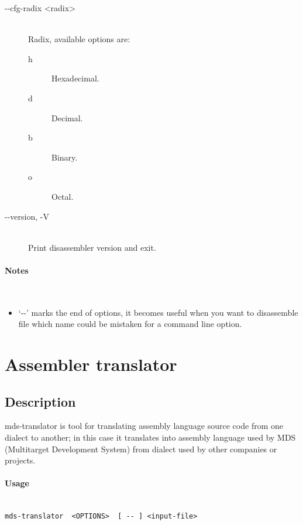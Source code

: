 \begin{description}
            \item[-{}-cfg-radix <radix>]~\\
                Radix, available options are:
                \begin{description}
                    \item [h] Hexadecimal.
                    \item [d] Decimal.
                    \item [b] Binary.
                    \item [o] Octal.
                \end{description}


            \item[-{}-version, -V]~\\
                Print disassembler version and exit.
        \end{description}

    \paragraph{Notes}~\\
        \begin{itemize}
            \item `-{}-' marks the end of options, it becomes useful when you want to disassemble file which name could be mistaken for a command line option.
        \end{itemize}

\section{Assembler translator}
    \subsection{Description}
        mds-translator is tool for translating assembly language source code from one dialect to another; in this case it translates into assembly language used by MDS (Multitarget Development System) from dialect used by other companies or projects.

    \paragraph{Usage}~\\
        \verb'mds-translator  <OPTIONS>  [ -- ] <input-file>'

